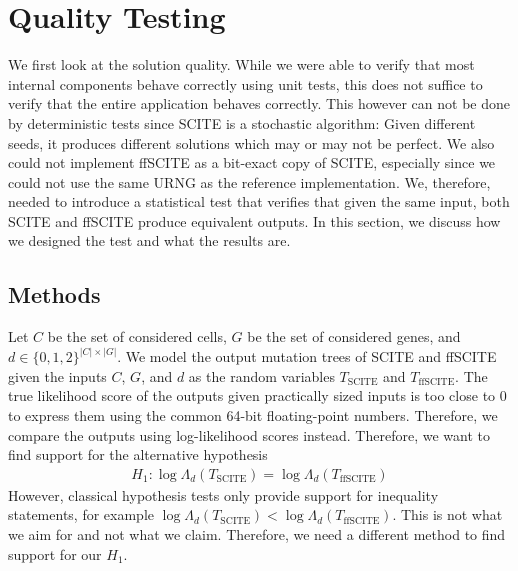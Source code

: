 \section{Quality Testing}

We first look at the solution quality. While we were able to verify that most internal components behave correctly using unit tests, this does not suffice to verify that the entire application behaves correctly. This however can not be done by deterministic tests since \ac{SCITE} is a stochastic algorithm: Given different seeds, it produces different solutions which may or may not be perfect. We also could not implement \ac{ffSCITE} as a bit-exact copy of \ac{SCITE}, especially since we could not use the same \ac{URNG} as the reference implementation. We, therefore, needed to introduce a statistical test that verifies that given the same input, both \ac{SCITE} and \ac{ffSCITE} produce equivalent outputs. In this section, we discuss how we designed the test and what the results are.

\subsection{Methods}

Let $C$ be the set of considered cells, $G$ be the set of considered genes, and $d \in \{0,1,2\}^{|C| \times |G|}$. We model the output mutation trees of \ac{SCITE} and \ac{ffSCITE} given the inputs $C$, $G$, and $d$ as the random variables $T_\mathrm{SCITE}$ and $T_\mathrm{ffSCITE}$. The true likelihood score of the outputs given practically sized inputs is too close to 0 to express them using the common 64-bit floating-point numbers. Therefore, we compare the outputs using log-likelihood scores instead. Therefore, we want to find support for the alternative hypothesis 
\begin{align*}
    H_1: \log\Lambda_d(T_\mathrm{SCITE}) = \log\Lambda_d(T_\mathrm{ffSCITE})
\end{align*}
However, classical hypothesis tests only provide support for inequality statements, for example $\log\Lambda_d(T_\mathrm{SCITE}) < \log\Lambda_d(T_\mathrm{ffSCITE})$. This is not what we aim for and not what we claim. Therefore, we need a different method to find support for our $H_1$.

